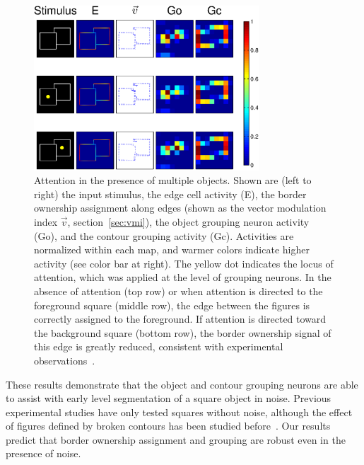 \begin{figure}[htbp]
\centering
\includegraphics[width=0.75\textwidth]{Contour/figs/Fig8.eps}
\makeatletter
\let\@currsize\normalsize
\caption{Attention in the presence of multiple objects. Shown are (left to right) the input stimulus, the edge cell activity (E), the border ownership assignment along edges (shown as the vector modulation index $\vec{v}$, section~\ref{sec:vmi}), the object grouping neuron activity (Go), and the contour grouping activity (Gc). Activities are normalized within each map, and warmer colors indicate higher activity (see color bar at right). The yellow dot indicates the locus of attention, which was applied at the level of grouping neurons. In the absence of attention (top row) or when attention is directed to the foreground square (middle row), the edge between the figures is correctly assigned to the foreground. If attention is directed toward the background square (bottom row), the border ownership signal of this edge is greatly reduced, consistent with experimental observations~\citep{Qiu_etal07}.}
\label{Fig:Overlap_Square}
\end{figure}

These results demonstrate that the object and contour grouping neurons  
are able to assist with early level segmentation of a square object in noise. Previous experimental studies have only tested squares without noise, although the effect of figures defined by broken contours has been studied before~\citep{Zhang_vonderHeydt10}. Our results predict that  border ownership assignment and grouping are robust even in the
presence of noise.

